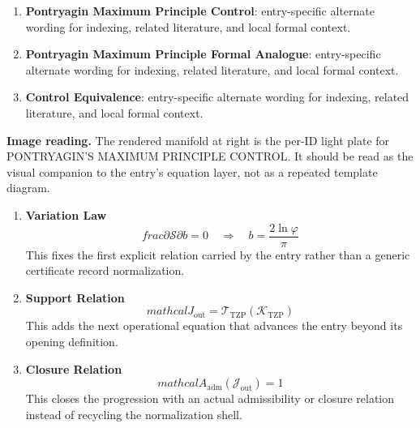 \begin{enumerate}[leftmargin=1.6em,itemsep=6pt,topsep=4pt]
\item \textbf{Pontryagin Maximum Principle Control}: entry-specific alternate wording for indexing, related literature, and local formal context.
\item \textbf{Pontryagin Maximum Principle Formal Analogue}: entry-specific alternate wording for indexing, related literature, and local formal context.
\item \textbf{Control Equivalence}: entry-specific alternate wording for indexing, related literature, and local formal context.
\end{enumerate}

\begin{samepage}
\noindent\begin{minipage}[t]{0.45\linewidth}
\vspace{0pt}
\raggedright
\scriptsize\textbf{Image reading.} The rendered manifold at right is the per-ID light plate for PONTRYAGIN'S MAXIMUM PRINCIPLE CONTROL. It should be read as the visual companion to the entry's equation layer, not as a repeated template diagram.\par
\end{minipage}\hfill
\begin{minipage}[t]{0.53\linewidth}
\vspace*{-0.10in}
\raggedright
{}
\end{minipage}
\end{samepage}

\clearpage


\begin{enumerate}[leftmargin=1.6em,itemsep=9pt,topsep=6pt]
\item \textbf{Variation Law}
\[
frac{\partial \mathcal{S}}{\partial b} = 0 \quad\Longrightarrow\quad b = \frac{2\ln \varphi}{\pi}
\]
This fixes the first explicit relation carried by the entry rather than a generic certificate record normalization.

\item \textbf{Support Relation}
\[
mathcal{J}_{\mathrm{out}} = \mathcal{T}_{\mathrm{TZP}}\!\left(\mathcal{K}_{\mathrm{TZP}}\right)
\]
This adds the next operational equation that advances the entry beyond its opening definition.

\item \textbf{Closure Relation}
\[
mathcal{A}_{\mathrm{adm}}\!\left(\mathcal{J}_{\mathrm{out}}\right)=1
\]
This closes the progression with an actual admissibility or closure relation instead of recycling the normalization shell.
\end{enumerate}

